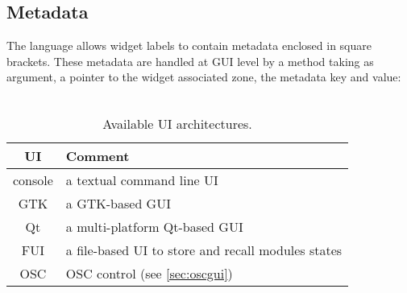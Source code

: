 \subsection{Metadata}
\label{sec:metadata}
The \faust language allows widget labels to contain metadata enclosed in square brackets. These metadata are handled at GUI level by a  method taking as argument, a pointer to the widget associated zone, the metadata key and value: \\
\htab{} \\


\begin{table}[htp]
\begin{center}
\begin{tabular}{|c|l|}
\hline
\bf{UI} & \bf{Comment} \\
\hline
console  & a textual command line UI \\
GTK  & a GTK-based GUI \\
Qt   & a multi-platform Qt-based GUI \\
FUI  & a file-based UI to store and recall modules states \\
OSC  & OSC control (see \ref{sec:oscgui}) \\
\hline
\end{tabular}
\end{center}
\caption{Available UI architectures.}
\label{tab:uiarch}
\end{table}%

